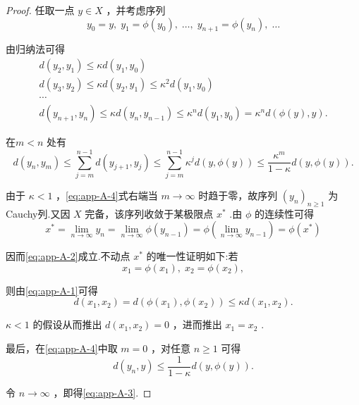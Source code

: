 \begin{proof}
任取一点 $y \in  X$ ，并考虑序列
\[
{y}_{0} = y,\;{y}_{1} = \phi \left( {y}_{0}\right) ,\;\ldots ,\;{y}_{n + 1} = \phi \left( {y}_{n}\right) ,\;\ldots
\]

由归纳法可得
{\setjot[-2]\begin{gather*}
    d\left( {{y}_{2},{y}_{1}}\right)  \leq  {\kappa d}\left( {{y}_{1},{y}_{0}}\right)\\
    d\left( {{y}_{3},{y}_{2}}\right)  \leq  {\kappa d}\left( {{y}_{2},{y}_{1}}\right)  \leq  {\kappa }^{2}d\left( {{y}_{1},{y}_{0}}\right)\\
    \cdots \\
d\left( {{y}_{n + 1},{y}_{n}}\right)  \leq  {\kappa d}\left( {{y}_{n},{y}_{n - 1}}\right)  \leq  {\kappa }^{n}d\left( {{y}_{1},{y}_{0}}\right)  = {\kappa }^{n}d\left( {\phi \left( y\right) ,y}\right) .
\end{gather*}}

在$m < n$ 处有
\begin{equation}\tag{A.4}\label{eq:app-A-4}
d\left( {{y}_{n},{y}_{m}}\right)  \leq  \sum_{{j = m}}^{{n - 1}}d\left( {{y}_{j + 1},{y}_{j}}\right)  \leq  \sum_{{j = m}}^{{n - 1}}{\kappa }^{j}d\left( {y,\phi \left( y\right) }\right)  \leq  \frac{{\kappa }^{m}}{1 - \kappa }d\left( {y,\phi \left( y\right) }\right) .
\end{equation}

由于 $\kappa  < 1$ ，\eqref{eq:app-A-4}式右端当 $m \rightarrow  \infty$ 时趋于零，故序列 ${\left( {y}_{n}\right) }_{n \geq  1}$ 为Cauchy列.又因 $X$ 完备，该序列收敛于某极限点 ${x}^{ * }$ .由 $\phi$ 的连续性可得
\[
{x}^{ * } = \mathop{\lim }\limits_{{n \rightarrow  \infty }}{y}_{n} = \mathop{\lim }\limits_{{n \rightarrow  \infty }}\phi \left( {y}_{n - 1}\right)  = \phi \left( {\mathop{\lim }\limits_{{n \rightarrow  \infty }}{y}_{n - 1}}\right)  = \phi \left( {x}^{ * }\right)
\]

因而\eqref{eq:app-A-2}成立.不动点 ${x}^{ * }$ 的唯一性证明如下:若
\[
{x}_{1} = \phi \left( {x}_{1}\right) ,\;{x}_{2} = \phi \left( {x}_{2}\right) ,
\]

则由\eqref{eq:app-A-1}可得
\[
d\left( {{x}_{1},{x}_{2}}\right)  = d\left( {\phi \left( {x}_{1}\right) ,\phi \left( {x}_{2}\right) }\right)  \leq  {\kappa d}\left( {{x}_{1},{x}_{2}}\right) .
\]

$\kappa  < 1$ 的假设从而推出 $d\left( {{x}_{1},{x}_{2}}\right)  = 0$ ，进而推出 ${x}_{1} = {x}_{2}$ .

最后，在\eqref{eq:app-A-4}中取 $m = 0$ ，对任意 $n \geq  1$ 可得
\[
d\left( {{y}_{n},y}\right)  \leq  \frac{1}{1 - \kappa }d\left( {y,\phi \left( y\right) }\right) .
\]

令 $n \rightarrow  \infty$ ，即得\eqref{eq:app-A-3}.
\end{proof}

